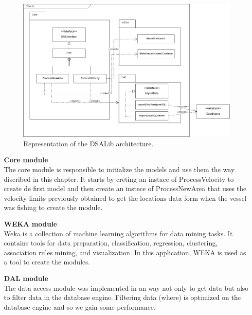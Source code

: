 \begin{figure}[h]
    \centering
    \includegraphics[width=1.0\linewidth]{Chapters/img/DSALib_Prof.png}
    \caption{Representation of the DSALib architecture.}
    \label{fig:DSALib_Prof}
\end{figure}



\textbf{Core module} \\The core module is responsible to initialize the models and use them the way discribed in this chapter. It starts by creting an instace of ProcessVelocity to create de first model and then create an instece of ProcessNewArea that uses the velocity limits previously obtained to get the locations data form when the vessel was fishing to create the module.

\textbf{WEKA module} \\Weka is a collection of machine learning algorithms for data mining tasks. It contains tools for data preparation, classification, regression, clustering, association rules mining, and visualization. In this application, WEKA is used as a tool to create the modules.

\textbf{DAL module} \\The data access module was implemented in an way not only to get data but also to filter data in the database engine. Filtering data (where) is optimized on the database engine and so we gain some performance.




